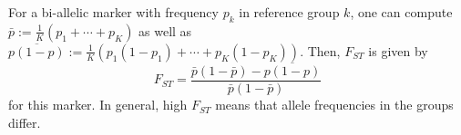 \documentclass{article}
\theoremstyle{definition}
\theoremstyle{step} \newtheorem{step}{Step}
\begin{document}
\vspace{2cm} For a bi-allelic marker with frequency $p_k$ in reference
group $k$, one can compute $\bar p := \frac{1}{K}(p_1 + \cdots + p_K)$
as well as $\overline{p(1-p)} := \frac{1}{K}(p_1(1-p_1) + \cdots +
p_K(1-p_K))$. Then, $F_{ST}$ is given by
$$ F_{ST} = \frac{\bar p(1-\bar p) - \overline{p(1-p)}}{\bar p(1-\bar
  p)}$$ for this marker. In general, high $F_{ST}$ means that allele
frequencies in the groups differ.
\end{document}
